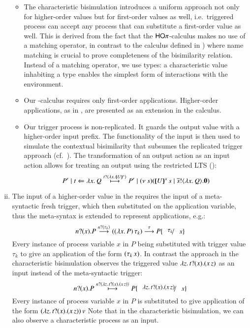 \begin{enumerate}[i)]
\begin{itemize}
			\item	The characteristic bisimulation introduces a uniform approach
				not only for
				higher-order values but for first-order values
				as well, i.e.~triggered process can accept any
				process that can substitute a first-order value as well.
				This is derived from the fact that the $\mathsf{HO}\pi$-calculus makes no use of a matching operator, in contrast
				to the calculus defined in \cite{JeffreyR05})
				where name matching is crucial to prove completeness
				of the bisimilarity relation.
				Instead of a matching operator, 
we use types: a characteristic value inhabiting a type
enables the simplest form of interactions 
				with the environment.

			\item	Our \HOp-calculus requires only first-order
				applications. Higher-order applications,
				as in \cite{JeffreyR05},
				are presented as an extension in the \HOpp
				calculus.

			\item	Our trigger process is non-replicated. 
				It guards the output
				value with a higher-order input prefix. The
				functionality of the input is then used to
				simulate the contextual bisimilarity that subsumes
				the replicated trigger approach (cf.~).
				The transformation of an output action as an input
				action allows for treating an output
				using the restricted LTS ():
				\[
					P' \Par \htrigger{t}{\abs{x}{Q}} \hby{\bactinp{t}{\abs{x}{\mapchar{U}{x}}}}
					P' \Par \news{s}{ (\appl{\mapchar{U}{x}}{s} \Par \bout{\dual{s}}{\abs{x}{Q}} \inact)}
				\]
		\end{itemize}

	\item	The input of a higher-order value in the \cite{JeffreyR05}
		requires 
		the input of a meta-syntactic fresh trigger, which then
		substituted on the application variable, thus the meta-syntax
		is extended to represent applications, e.g.:
		\[
			\binp{n}{x} P \by{\bactinp{n}{\tau_k}} (\appl{(\abs{x}{P})}{\tau_k}) \by{\tau} P \subst{\tau_k}{x} 
		\]
		Every instance of process variable $x$ in $P$ being substituted
		with trigger value $\tau_k$ to give an application of the form $(\tau_k\,x)$.
		In contrast the approach in the characteristic bisimulation observes the
		triggered value
		$\lambda z.\,t ? (x) . (x\,z)$ as an input instead of the
		meta-syntactic trigger:
		\[
			\binp{n}{x} P \hby{\bactinp{n}{\abs{z}\binp{t}{x} (\appl{x}{z})}} P \subst{\abs{z}\binp{t}{x} (\appl{x}{z})}{x}
		\]
		Every instance of process variable $x$ in $P$
		is substituted to give application of the form
		$(\lambda z.\,t ? (x) . (x\,z))\,v$
		Note that in the characteristic bisimulation, 
		we can also observe a characteristic process as an input.
		

\end{enumerate}
